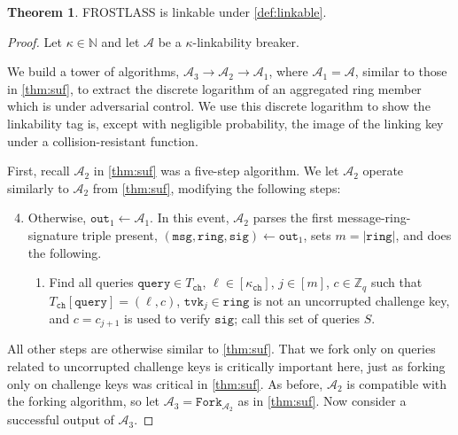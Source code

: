\documentclass[11pt]{article}
\theoremstyle{definition}
\newtheorem{theorem}{Theorem}[section]
\newcommand{\tvk}{\texttt{tvk}}
\newcommand{\ring}{\texttt{ring}}
\newcommand{\sig}{\texttt{sig}}
\newcommand{\Zq}{\mathbb{Z}_q}
\newcommand{\msg}{\texttt{msg}}
\begin{document}
\begin{theorem}
FROSTLASS is linkable under \cref{def:linkable}. 
\end{theorem}
\begin{proof}
Let $\kappa \in \mathbb{N}$ and let $\mathcal{A}$ be a $\kappa$-linkability breaker. 

We build a tower of algorithms, $\mathcal{A}_3 \to \mathcal{A}_2 \to \mathcal{A}_1$, where $\mathcal{A}_1 = \mathcal{A}$, similar to those in \cref{thm:suf}, to extract the discrete logarithm of an aggregated ring member which is under adversarial control. We use this discrete logarithm to show the linkability tag is, except with negligible probability, the image of the linking key under a collision-resistant function.

First, recall $\mathcal{A}_2$ in \cref{thm:suf} was a five-step algorithm. We let $\mathcal{A}_2$ operate similarly to $\mathcal{A}_2$ from \cref{thm:suf}, modifying the following steps:
\begin{enumerate}
\setcounter{enumi}{3}
\item Otherwise, $\texttt{out}_1 \leftarrow \mathcal{A}_1$. In this event, $\mathcal{A}_2$ parses the first message-ring-signature triple present, $(\msg, \ring, \sig) \leftarrow \texttt{out}_1$, sets $m = \left|\ring\right|$, and does the following.
\begin{enumerate}
\item Find all queries $\texttt{query} \in T_{\texttt{ch}}$, $\ell \in [\kappa_{\texttt{ch}}]$, $j \in [m]$, $c \in \Zq$ such that $T_{\texttt{ch}}[\texttt{query}] = (\ell, c)$, $\tvk_j \in \ring$ is not an uncorrupted challenge key, and $c=c_{j+1}$ is used to verify $\sig$; call this set of queries $S$.
\end{enumerate}
\end{enumerate}
All other steps are otherwise similar to \cref{thm:suf}. That we fork only on queries related to uncorrupted challenge keys is critically important here, just as forking only on challenge keys was critical in \cref{thm:suf}. As before, $\mathcal{A}_2$ is compatible with the forking algorithm, so let $\mathcal{A}_3 = \texttt{Fork}_{\mathcal{A}_2}$ as in \cref{thm:suf}. Now consider a successful output of $\mathcal{A}_3$. 


\end{proof}
\end{document}
